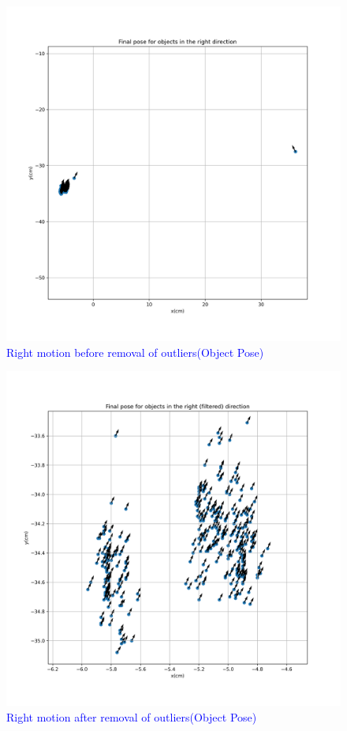     
    \begin{figure}[H] 
            \centering \includegraphics[width=\textwidth]{"images/experiment_5/Final_pose_for_objects_in_the_right_direction.png"}
            \caption{\textcolor{blue}{Right motion before removal of outliers(Object Pose)}}
            \label{fig:exp05-right-end-poses-before}
    \end{figure}
    
    \begin{figure}[H] 
            \centering \includegraphics[width=\textwidth]{"images/experiment_5/Final_pose_for_objects_in_the_right (filtered)_direction.png"}
            \caption{\textcolor{blue}{Right motion after removal of outliers(Object Pose)}}
            \label{fig:exp05-right-end-poses-after}
    \end{figure}
    
